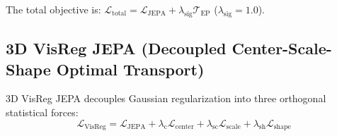 \documentclass{article}
\begin{document}
The total objective is: $\mathcal{L}_{\text{total}} = \mathcal{L}_{\text{JEPA}} + \lambda_{\text{sig}} \mathcal{T}_{\text{EP}}$ ($\lambda_{\text{sig}} = 1.0$).

\subsection{3D VisReg JEPA (Decoupled Center-Scale-Shape Optimal Transport)}

3D VisReg JEPA \citep{wu2026visreg} decouples Gaussian regularization into three orthogonal statistical forces:
\begin{equation}
    \mathcal{L}_{\text{VisReg}} = \mathcal{L}_{\text{JEPA}} + \lambda_{\text{c}} \mathcal{L}_{\text{center}} + \lambda_{\text{sc}} \mathcal{L}_{\text{scale}} + \lambda_{\text{sh}} \mathcal{L}_{\text{shape}}
\end{equation}
\end{document}
